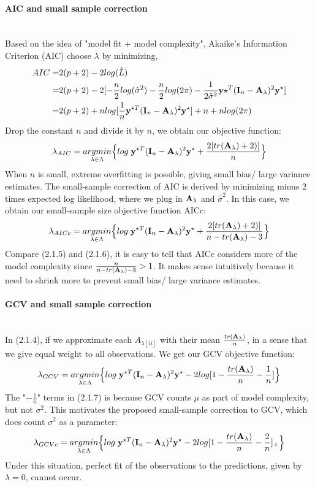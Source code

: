 \documentclass[11pt]{article}
\begin{document}
\paragraph{AIC and small sample correction}\mbox{}\\
Based on the idea of "model fit + model complexity", Akaike's Information Criterion (AIC) choose $\lambda$ by minimizing,
\begin{align*}
AIC=&2(p+2)-2log(\hat{L})\\
=&2(p+2)-2[-\frac{n}{2}log (\hat{\sigma}^2)-\frac{n}{2}log (2\pi)-\frac{1}{2\hat{\sigma}^2}{\bf y}{\star^T}({\bf I}_n-{\bf A}_\lambda)^2{\bf y}^\star]\\
=&2(p+2)+n log[\frac{1}{n}{\bf y}^{\star T}({\bf I}_n-{\bf A}_\lambda)^2{\bf y}^\star]+n+n log(2\pi)
\end{align*}
Drop the constant $n$ and divide it by $n$, we obtain our objective function:
\begin{align}
\lambda_{AIC}=\underset{\lambda \in \Lambda}{argmin}\Big\{log\; {\bf y}^{\star T}({\bf I}_n-{\bf A}_\lambda)^2{\bf y}^\star+\frac{2[tr({\bf A}_\lambda)+2)]}{n}\Big\}
\end{align}
When $n$ is small, extreme overfitting is possible, giving small bias/ large variance estimates. The small-sample correction of AIC is derived by minimizing minus 2 times expected log likelihood, where we plug in ${\bf A}_\lambda$ and $\hat{\sigma}^2$. In this case, we obtain our small-sample size objective function AICc:
\begin{align}
\lambda_{AICc}=\underset{\lambda \in \Lambda}{argmin}\Big\{log\; {\bf y}^{\star T}({\bf I}_n-{\bf A}_\lambda)^2{\bf y}^\star+\frac{2[tr({\bf A}_\lambda)+2)]}{n-tr({\bf A}_\lambda)-3}\Big\}
\end{align}
Compare (2.1.5) and (2.1.6), it is easy to tell that AICc considers more of the model complexity since $\frac{n}{n-tr({\bf A}_\lambda)-3}>1$. It makes sense intuitively because it need to shrink more to prevent small bias/ large variance estimates.

\paragraph{GCV and small sample correction}\mbox{}\\
In (2.1.4), if we approximate each $A_{\lambda[ii]}$ with their mean $\frac{tr({\bf A}_\lambda)}{n}$, in a sense that we give equal weight to all observations. We get our GCV objective function:
\begin{align}
\lambda_{GCV}=\underset{\lambda \in \Lambda}{argmin}\Big\{log\; {\bf y}^{\star T}({\bf I}_n-{\bf A}_\lambda)^2{\bf y}^\star-2log[1-\frac{tr({\bf A}_\lambda)}{n}-\frac{1}{n}]\Big\}
\end{align}
The "$-\frac{1}{n}$" terms in (2.1.7) is because GCV counts $\mu$ as part of model complexity, but not $\sigma^2$. This motivates the proposed small-sample correction to GCV, which does count $\sigma^2$ as a parameter:
\begin{align}
\lambda_{GCVc}=\underset{\lambda \in \Lambda}{argmin}\Big\{log\; {\bf y}^{\star T}({\bf I}_n-{\bf A}_\lambda)^2{\bf y}^\star-2log[1-\frac{tr({\bf A}_\lambda)}{n}-\frac{2}{n}]_+\Big\}
\end{align}
Under this situation, perfect fit of the observations to the predictions, given by $\lambda=0$, cannot occur.
\end{document}
